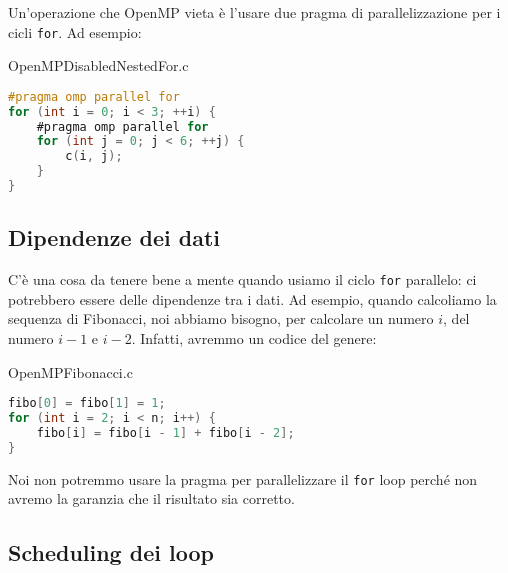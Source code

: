 Un'operazione che OpenMP vieta è l'usare due pragma di parallelizzazione per i cicli \verb|for|. Ad esempio:

\begin{codeblock}{OpenMPDisabledNestedFor.c}
    \begin{lstlisting}[language = C]
#pragma omp parallel for
for (int i = 0; i < 3; ++i) {
    #pragma omp parallel for
    for (int j = 0; j < 6; ++j) {
        c(i, j);
    }
}\end{lstlisting}
\end{codeblock}

\subsection{Dipendenze dei dati}

C'è una cosa da tenere bene a mente quando usiamo il ciclo \verb|for| parallelo: ci potrebbero essere delle dipendenze tra i dati. Ad esempio, quando calcoliamo la sequenza di Fibonacci, noi abbiamo bisogno, per calcolare un numero $i$, del numero $i - 1$ e $i - 2$. Infatti, avremmo un codice del genere:

\begin{codeblock}{OpenMPFibonacci.c}
    \begin{lstlisting}[language = C]
fibo[0] = fibo[1] = 1;
for (int i = 2; i < n; i++) {
    fibo[i] = fibo[i - 1] + fibo[i - 2];
}\end{lstlisting}
\end{codeblock}

Noi non potremmo usare la pragma per parallelizzare il \verb|for| loop perché non avremo la garanzia che il risultato sia corretto.


\subsection{Scheduling dei loop}

